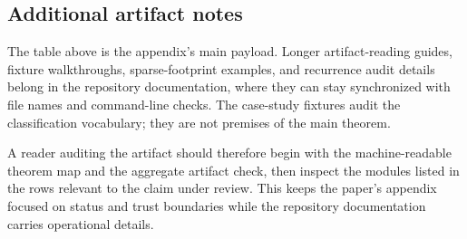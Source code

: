 \documentclass{lmcs}
\begin{document}
\subsection{Additional artifact notes}
\label{subsec:additional-artifact-notes}

The table above is the appendix's main payload.  Longer artifact-reading guides, fixture
walkthroughs, sparse-footprint examples, and recurrence audit details belong in the repository
documentation, where they can stay synchronized with file names and command-line checks.  The
case-study fixtures audit the classification vocabulary; they are not premises of the main
theorem.

A reader auditing the artifact should therefore begin with the machine-readable theorem map and
the aggregate artifact check, then inspect the modules listed in the rows relevant to the claim
under review.  This keeps the paper's appendix focused on status and trust boundaries while the
repository documentation carries operational details.



\end{document}
